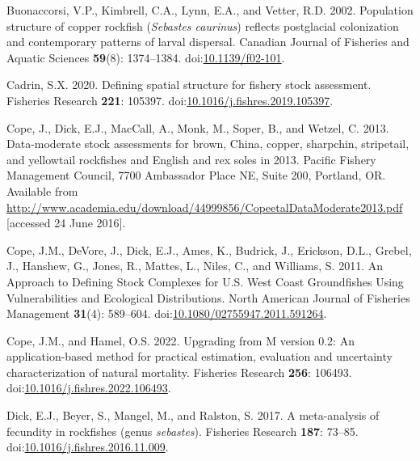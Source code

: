 \documentclass[11pt,
  english,
  letterpaper,
]{article}
\newlength{\cslhangindent}
\newenvironment{CSLReferences}[2] %
 {%
  \setlength{\parindent}{0pt}
  \ifodd #1 \everypar{\setlength{\hangindent}{\cslhangindent}}\ignorespaces\fi
  \ifnum #2 > 0
  \setlength{\parskip}{#2\baselineskip}
  \fi
 }%
 {}
\begin{document}
\begin{CSLReferences}{1}{0}
\leavevmode{}%
Buonaccorsi, V.P., Kimbrell, C.A., Lynn, E.A., and Vetter, R.D. 2002. Population structure of copper rockfish (\emph{{Sebastes} caurinus}) reflects postglacial colonization and contemporary patterns of larval dispersal. Canadian Journal of Fisheries and Aquatic Sciences \textbf{59}(8): 1374--1384. doi:\href{https://doi.org/10.1139/f02-101}{10.1139/f02-101}.

\leavevmode{}%
Cadrin, S.X. 2020. Defining spatial structure for fishery stock assessment. Fisheries Research \textbf{221}: 105397. doi:\href{https://doi.org/10.1016/j.fishres.2019.105397}{10.1016/j.fishres.2019.105397}.

\leavevmode{}%
Cope, J., Dick, E.J., MacCall, A., Monk, M., Soper, B., and Wetzel, C. 2013. Data-moderate stock assessments for brown, {China}, copper, sharpchin, stripetail, and yellowtail rockfishes and {English} and rex soles in 2013. Pacific Fishery Management Council, 7700 Ambassador Place NE, Suite 200, Portland, OR. Available from \url{http://www.academia.edu/download/44999856/CopeetalDataModerate2013.pdf} {[}accessed 24 June 2016{]}.

\leavevmode{}%
Cope, J.M., DeVore, J., Dick, E.J., Ames, K., Budrick, J., Erickson, D.L., Grebel, J., Hanshew, G., Jones, R., Mattes, L., Niles, C., and Williams, S. 2011. An {Approach} to {Defining} {Stock} {Complexes} for {U}.{S}. {West} {Coast} {Groundfishes} {Using} {Vulnerabilities} and {Ecological} {Distributions}. North American Journal of Fisheries Management \textbf{31}(4): 589--604. doi:\href{https://doi.org/10.1080/02755947.2011.591264}{10.1080/02755947.2011.591264}.

\leavevmode{}%
Cope, J.M., and Hamel, O.S. 2022. Upgrading from {M} version 0.2: {An} application-based method for practical estimation, evaluation and uncertainty characterization of natural mortality. Fisheries Research \textbf{256}: 106493. doi:\href{https://doi.org/10.1016/j.fishres.2022.106493}{10.1016/j.fishres.2022.106493}.

\leavevmode{}%
Dick, E.J., Beyer, S., Mangel, M., and Ralston, S. 2017. A meta-analysis of fecundity in rockfishes (genus \emph{sebastes}). Fisheries Research \textbf{187}: 73--85. doi:\href{https://doi.org/10.1016/j.fishres.2016.11.009}{10.1016/j.fishres.2016.11.009}.


\end{CSLReferences}
\end{document}
